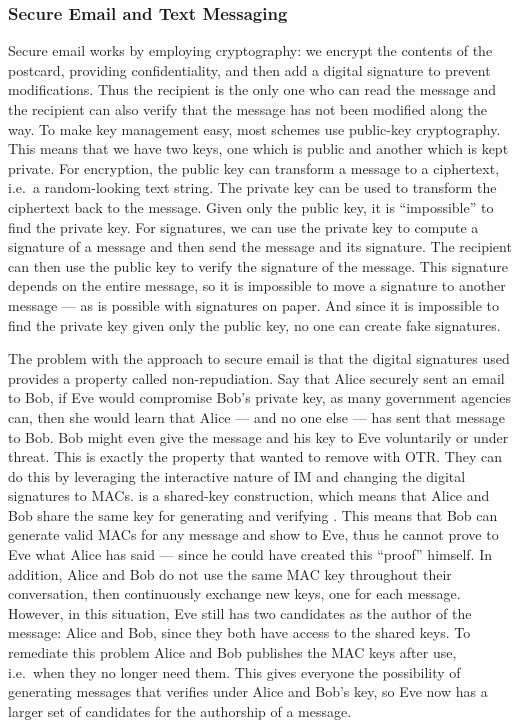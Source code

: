 \subsubsection{Secure Email and Text Messaging}

Secure email works by employing cryptography: we encrypt the contents of the 
postcard, providing confidentiality, and then add a digital signature to 
prevent modifications.
Thus the recipient is the only one who can read the message and the recipient 
can also verify that the message has not been modified along the way.
To make key management easy, most schemes use public-key cryptography.
This means that we have two keys, one which is public and another which is kept
private.
For encryption, the public key can transform a message to a ciphertext, i.e.\ 
a random-looking text string.
The private key can be used to transform the ciphertext back to the message.
Given only the public key, it is \enquote{impossible} to find the private key.
For signatures, we can use the private key to compute a signature of a message 
and then send the message and its signature.
The recipient can then use the public key to verify the signature of the 
message.
This signature depends on the entire message, so it is impossible to move 
a signature to another message --- as is possible with signatures on paper.
And since it is impossible to find the private key given only the public key, 
no one can create fake signatures.

The problem with the approach to secure email is that the digital signatures 
used provides a property called non-repudiation.
Say that Alice securely sent an email to Bob, if Eve would compromise Bob's 
private key, as many government agencies can, then she would learn that Alice 
--- and no one else --- has sent that message to Bob.
Bob might even give the message and his key to Eve voluntarily or under threat.
This is exactly the property that \citeauthor{otr2004} wanted to remove with 
\ac{OTR}.
They can do this by leveraging the interactive nature of \ac{IM} and changing 
the digital signatures to \acp{MAC}.
 is a shared-key construction, which means that Alice and Bob share 
the same key for generating and verifying \iac{MAC}.
This means that Bob can generate valid \acp{MAC} for any message and show to 
Eve, thus he cannot prove to Eve what Alice has said --- since he could have 
created this \enquote{proof} himself.
In addition, Alice and Bob do not use the same \ac{MAC} key throughout their 
conversation, then continuously exchange new keys, one for each message.
However, in this situation, Eve still has two candidates as the author of the 
message: Alice and Bob, since they both have access to the shared keys.
To remediate this problem Alice and Bob publishes the \ac{MAC} keys after use, 
i.e.\ when they no longer need them.
This gives everyone the possibility of generating messages that verifies under 
Alice and Bob's key, so Eve now has a larger set of candidates for the 
authorship of a message.

